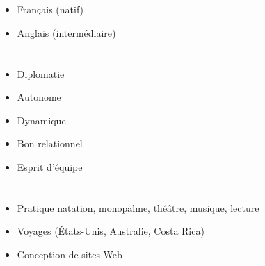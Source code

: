 \documentclass[10pt,a4paper]{article}
\newcommand{\myvspace}{\vspace{0.3cm}}
\newcommand{\myvspaceSection}{\vspace{0.7cm}}
\begin{document}
\begin{minipage}[t]{0.30\textwidth}
{\begin{minipage}{\textwidth}
    \section*{}
    \begin{itemize}[nosep, leftmargin=*, itemsep=0pt, parsep=0pt]
        \item Français (natif)
        \item Anglais (intermédiaire)
    \end{itemize}
    \myvspaceSection
    \section*{}
    \begin{itemize}[nosep, leftmargin=*, itemsep=0pt, parsep=0pt]
        \item Diplomatie
        \item Autonome
        \item Dynamique
        \item Bon relationnel
        \item Esprit d’équipe
    \end{itemize}
    \myvspaceSection
    \section*{}
    \begin{itemize}[nosep, leftmargin=*, itemsep=0pt, parsep=0pt]
        \item Pratique natation, monopalme, théâtre, musique, lecture
        \item Voyages (États-Unis, Australie, Costa Rica)
        \item Conception de sites Web
    \end{itemize}
    \myvspace
    \myvspace
    \myvspace
    \myvspace
\end{minipage}
\vspace{2cm}
}
\end{minipage}
\hfill{}
\indent
\end{document}
